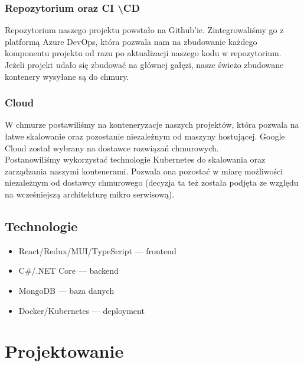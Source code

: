 \documentclass[a4paper,11pt]{report}
\begin{document}
\subsection{Repozytorium oraz CI \textbackslash CD}
Repozytorium naszego projektu powstało na Github'ie. Zintegrowaliśmy go z platformą Azure DevOps, 
która pozwala nam na zbudowanie każdego komponentu projektu od razu po aktualizacji naszego kodu w repozytorium.\\
Jeżeli projekt udało się zbudować na głównej gałęzi, nasze świeżo zbudowane kontenery wysyłane są do chmury.\\
\subsection{Cloud}
W chmurze postawiliśmy na konteneryzacje naszych projektów, która pozwala na łatwe
skalowanie oraz pozostanie niezależnym od maszyny hostującej. Google Cloud został wybrany na dostawce rozwiązań chmurowych.\\
Postanowiliśmy wykorzystać technologie Kubernetes do skalowania oraz zarządzania naszymi kontenerami. Pozwala ona pozostać w miarę możliwości
niezależnym od dostawcy chmurowego (decyzja ta też została podjęta ze względu na wcześniejszą architekturę mikro serwisową).
\section{Technologie}
		\begin{itemize}
			\item React/Redux/MUI/TypeScript — frontend
			\item C\#/.NET Core — backend
			\item MongoDB — baza danych
			\item Docker/Kubernetes — deployment
		\end{itemize}

\chapter {Projektowanie}
\end{document}
